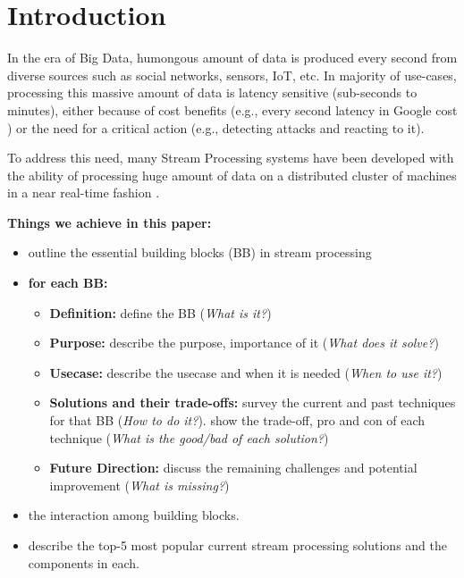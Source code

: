 \section{Introduction}
\label{sec:intro}

In the era of Big Data, humongous amount of data is produced every second from diverse sources such as social networks, sensors, IoT, etc. In majority of use-cases, processing this massive amount of data  is latency sensitive (sub-seconds to minutes), either because of  cost benefits (e.g., every second latency in Google cost ) or the need for a critical action (e.g., detecting attacks and reacting to it).

To address this need, many Stream Processing systems have been developed with the ability of processing huge amount of data on a distributed cluster of machines in a near real-time fashion .  


\textbf{Things we achieve in this paper: }

\begin{itemize}
	\item outline the essential building blocks (BB) in stream processing
	\item \textbf{for each BB: }
	\begin{itemize}
		\item \textbf{Definition: }  define the BB (\textit{What is it?})
		\item \textbf{Purpose: } describe the purpose, importance of it (\textit{What does it solve?})
		\item \textbf{Usecase: } describe the usecase and when it is needed (\textit{When to use it?})
		\item \textbf{Solutions and their trade-offs: } survey the current  and past techniques for that BB (\textit{How to do it?}). show the trade-off, pro and con of  each technique (\textit{What is the good/bad of each solution?})
		\item \textbf{Future Direction:} discuss the remaining challenges and potential improvement (\textit{What is missing?})
	\end{itemize}
	\item the interaction among building blocks.
	\item describe the top-5 most popular current stream processing solutions and the components in each.

\end{itemize}






